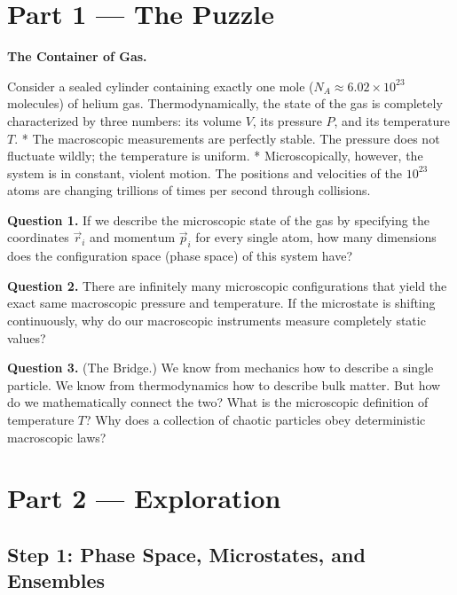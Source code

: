 \documentclass[12pt, a4paper, twoside]{book}
\begin{document}
\section{Part 1 --- The Puzzle}

\begin{puzzlebox}
\textbf{The Container of Gas.}

Consider a sealed cylinder containing exactly one mole ($N_A \approx 6.02 \times 10^{23}$ molecules) of helium gas. Thermodynamically, the state of the gas is completely characterized by three numbers: its volume $V$, its pressure $P$, and its temperature $T$. 
* The macroscopic measurements are perfectly stable. The pressure does not fluctuate wildly; the temperature is uniform.
* Microscopically, however, the system is in constant, violent motion. The positions and velocities of the $10^{23}$ atoms are changing trillions of times per second through collisions.

\medskip
\textbf{Question 1.} If we describe the microscopic state of the gas by specifying the coordinates $\vec{r}_i$ and momentum $\vec{p}_i$ for every single atom, how many dimensions does the configuration space (phase space) of this system have?

\textbf{Question 2.} There are infinitely many microscopic configurations that yield the exact same macroscopic pressure and temperature. If the microstate is shifting continuously, why do our macroscopic instruments measure completely static values?

\textbf{Question 3.} (The Bridge.) We know from mechanics how to describe a single particle. We know from thermodynamics how to describe bulk matter. But how do we mathematically connect the two? What is the microscopic definition of temperature $T$? Why does a collection of chaotic particles obey deterministic macroscopic laws?
\end{puzzlebox}

\newpage

\section{Part 2 --- Exploration}

\subsection{Step 1: Phase Space, Microstates, and Ensembles}
\end{document}
